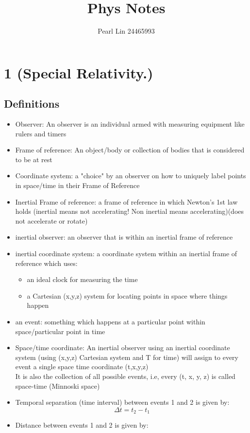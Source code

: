 \documentclass[10pt]{report}
\author{Pearl Lin 24465993}
\title{Phys Notes}
\begin{document}
\maketitle
\chapter{1 (Special Relativity.)}
\section{Definitions}
\begin{itemize}
	\item{Observer: An observer is an individual armed with measuring equipment like rulers and timers}
	\item{Frame of reference: An object/body or collection of bodies that is considered to be at rest}
	\item{Coordinate system: a "choice" by an observer on how to uniquely label points in space/time in their Frame of Reference}
	\item{Inertial Frame of reference: a frame of reference in which Newton's 1st law holds (inertial means not accelerating! Non inertial means accelerating)(does not accelerate or rotate)}
	\item{inertial observer: an observer that is within an inertial frame of reference}
	\item{inertial coordinate system: a coordinate system within an inertial frame of reference which uses:}
		\begin{itemize}
			\item{an ideal clock for measuring the time}
			\item{a Cartesian (x,y,z) system for locating points in space where things happen}
		\end{itemize}
	\item{an event: something which happens at a particular point within space/particular point in time}
	\item{Space/time coordinate: An inertial observer using an inertial coordinate system (using (x,y,z) Cartesian system and T for time) will assign to every event a single space time coordinate (t,x,y,z)\\ It is also the collection of all possible events, i.e, every (t, x, y, z) is called space-time (Minnoski space)}
	\item{Temporal separation (time interval) between events 1 and 2 is given by: \[
	\Delta t=t_{2}-t_{1}
	\] 
	}
	\item{Distance between events 1 and 2 is given by:
}
\end{itemize}
\end{document}
